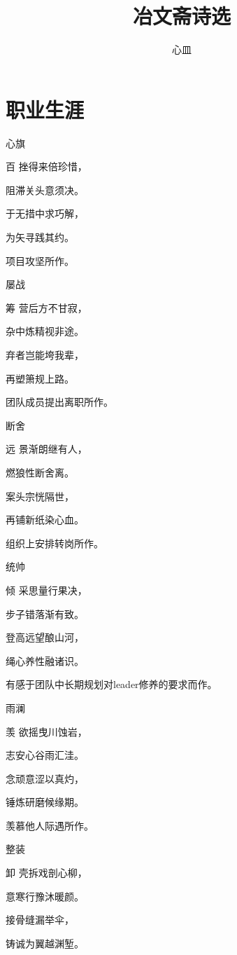 \documentclass{article}
\title{冶文斋诗选}
\author{心皿}
\newenvironment{poem}[3]{
\begin{minipage}{\textwidth}
\begin{pinyinscope}\begin{center}\Large\linespread{1.4}\selectfont #2\end{center}\end{pinyinscope}
\begin{pinyinscope}
	\begin{center}
	\Large\linespread{1.4}\rmfamily\selectfont #3
}{\end{center}
\end{pinyinscope}
\end{minipage}
}
\begin{document}
\date{}
\maketitle

\section{职业生涯}

\begin{poem}{}{心旗}
百挫得来倍珍惜，

阻滞关头意须决。

于无措中求巧解，

为矢寻{}践其约。
\end{poem}

项目攻坚所作。

\begin{poem}{}{屡战}
筹营后方不甘寂，

杂中炼精视非途。

弃者岂能垮我辈，

再塑箫规{}上路。
\end{poem}

团队成员提出离职所作。

\begin{poem}{}{断舍}
远景渐朗继有人，

{}燃狼性断舍离。

案头宗{}恍隔世，

再铺新纸染心血。
\end{poem}

组织上安排转岗所作。

\begin{poem}{}{统帅}
倾采思量行果决，

步子错落渐有致。

登高远望酿山河，

绳心养性融诸识。
\end{poem}

有感于团队中长期规划对leader修养的要求而作。

\begin{poem}{}{雨澜}
羡欲摇曳川蚀岩，

志安心谷雨汇洼。

念顽意涩以真灼，

锤炼研磨候缘期。
\end{poem}

羡慕他人际遇所作。

\begin{poem}{}{整装}
卸壳拆戏剖心柳，

意寒行豫沐暖颜。

接骨缝漏{}举伞，

铸诚为翼越渊堑。
\end{poem}
\end{document}

